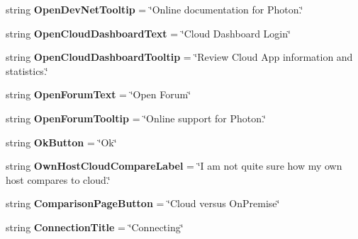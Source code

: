 \begin{DoxyCompactItemize}
\item 
string {\bfseries Open\+Dev\+Net\+Tooltip} = \char`\"{}Online documentation for Photon.\char`\"{}\hypertarget{class_pun_wizard_text_afc24da1439691f6ccce7508b7a477098}{}\label{class_pun_wizard_text_afc24da1439691f6ccce7508b7a477098}

\item 
string {\bfseries Open\+Cloud\+Dashboard\+Text} = \char`\"{}Cloud Dashboard Login\char`\"{}\hypertarget{class_pun_wizard_text_a2c646651f0fc0c7f67b446c3c1c4e3d7}{}\label{class_pun_wizard_text_a2c646651f0fc0c7f67b446c3c1c4e3d7}

\item 
string {\bfseries Open\+Cloud\+Dashboard\+Tooltip} = \char`\"{}Review Cloud App information and statistics.\char`\"{}\hypertarget{class_pun_wizard_text_a1b531189b2d2c2fe29b98a4591d5a5c0}{}\label{class_pun_wizard_text_a1b531189b2d2c2fe29b98a4591d5a5c0}

\item 
string {\bfseries Open\+Forum\+Text} = \char`\"{}Open Forum\char`\"{}\hypertarget{class_pun_wizard_text_aad4c0f1272271f27aae937366ab5c13f}{}\label{class_pun_wizard_text_aad4c0f1272271f27aae937366ab5c13f}

\item 
string {\bfseries Open\+Forum\+Tooltip} = \char`\"{}Online support for Photon.\char`\"{}\hypertarget{class_pun_wizard_text_a30aab510bbdee48dbe991522241a3e4a}{}\label{class_pun_wizard_text_a30aab510bbdee48dbe991522241a3e4a}

\item 
string {\bfseries Ok\+Button} = \char`\"{}Ok\char`\"{}\hypertarget{class_pun_wizard_text_af648bd493d80786ad6e80e1761197482}{}\label{class_pun_wizard_text_af648bd493d80786ad6e80e1761197482}

\item 
string {\bfseries Own\+Host\+Cloud\+Compare\+Label} = \char`\"{}I am not quite sure how \textquotesingle{}my own host\textquotesingle{} compares to \textquotesingle{}cloud\textquotesingle{}.\char`\"{}\hypertarget{class_pun_wizard_text_ab4bf251c3ea4d3fa69adc5a5e6d23561}{}\label{class_pun_wizard_text_ab4bf251c3ea4d3fa69adc5a5e6d23561}

\item 
string {\bfseries Comparison\+Page\+Button} = \char`\"{}Cloud versus On\+Premise\char`\"{}\hypertarget{class_pun_wizard_text_a606184854a665f62de5fb491443cd51b}{}\label{class_pun_wizard_text_a606184854a665f62de5fb491443cd51b}

\item 
string {\bfseries Connection\+Title} = \char`\"{}Connecting\char`\"{}\hypertarget{class_pun_wizard_text_a4c42b8421a2f4d75e522bb0bd2309f43}{}\label{class_pun_wizard_text_a4c42b8421a2f4d75e522bb0bd2309f43}


\end{DoxyCompactItemize}
